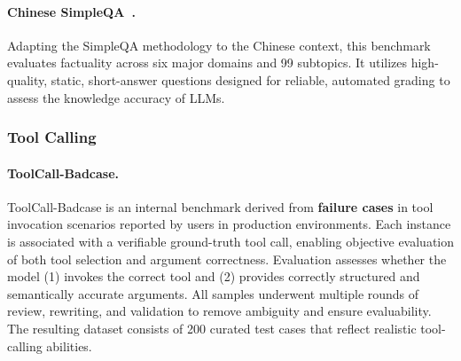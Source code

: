 \paragraph{Chinese SimpleQA~\citep{chinesesimpleQA}.} Adapting the SimpleQA methodology to the Chinese context, this benchmark evaluates factuality across six major domains and 99 subtopics. It utilizes high-quality, static, short-answer questions designed for reliable, automated grading to assess the knowledge accuracy of LLMs.

\subsubsection{Tool Calling}
\paragraph{ToolCall-Badcase.} ToolCall-Badcase is an internal benchmark derived from \textbf{failure cases} in tool invocation scenarios reported by users in production environments. Each instance is associated with a verifiable ground-truth tool call, enabling objective evaluation of both tool selection and argument correctness.
Evaluation assesses whether the model (1) invokes the correct tool and (2) provides correctly structured and semantically accurate arguments. 
All samples underwent multiple rounds of review, rewriting, and validation to remove ambiguity and ensure evaluability. The resulting dataset consists of 200 curated test cases that reflect realistic tool-calling abilities.
